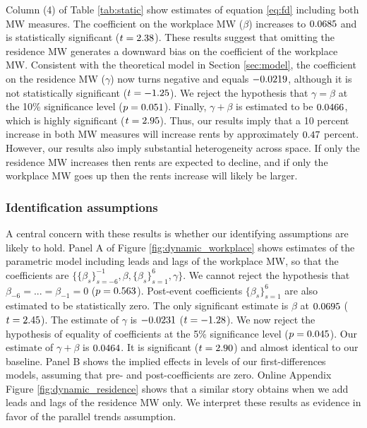 Column (4) of Table \ref{tab:static} show estimates of equation \eqref{eq:fd}
including both MW measures.
The coefficient on the workplace MW ($\beta$) increases to $0.0685$ and 
is statistically significant ($t=2.38$).
These results suggest that omitting the residence MW generates a downward
bias on the coefficient of the workplace MW.
Consistent with the theoretical model in Section \ref{sec:model}, the 
coefficient on the residence MW ($\gamma$) now turns negative and equals 
$-0.0219$, although it is not statistically significant 
($t=-1.25$).
We reject the hypothesis that $\gamma=\beta$ at the 10\% significance level 
($p = 0.051$).
Finally, $\gamma+\beta$ is estimated to be $0.0466$, which is highly 
significant ($t=2.95$).
Thus, our results imply that a 10 percent increase in both MW measures will 
increase rents by approximately $0.47$ percent.
However, our results also imply substantial heterogeneity across space.
If only the residence MW increases then rents are expected to decline,
and if only the workplace MW goes up then the rents increase will likely 
be larger.

\subsubsection{Identification assumptions}

A central concern with these results is whether our identifying assumptions are 
likely to hold.
Panel A of Figure \ref{fig:dynamic_workplace} shows estimates of the 
parametric model including leads and lags of the workplace MW, so that the 
coefficients are $\{\{\beta_s\}_{s=-6}^{-1},\beta,\{\beta_s\}_{s=1}^6,\gamma\}$.
We cannot reject the hypothesis that $\beta_{-6}=...=\beta_{-1}=0$ 
($p = 0.563$).
Post-event coefficients $\{\beta_s\}_{s=1}^6$ are also estimated to be 
statistically zero.
The only significant estimate is $\beta$ at $0.0695$ 
($t=2.45$).
The estimate of $\gamma$ is $-0.0231$ 
($t=-1.28$).
We now reject the hypothesis of equality of coefficients at the 5\% 
significance level ($p = 0.045$).
Our estimate of $\gamma+\beta$ is $0.0464$.
It is significant ($t=2.90$) and almost identical to our 
baseline.
Panel B shows the implied effects in levels of our first-differences models,
assuming that pre- and post-coefficients are zero.
Online Appendix Figure \ref{fig:dynamic_residence} shows that a similar story 
obtains when we add leads and lags of the residence MW only.
We interpret these results as evidence in favor of the parallel trends 
assumption.

